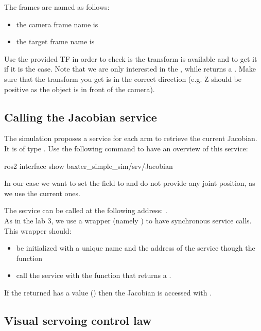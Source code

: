 \documentclass{ecnreport}
\begin{document}
The frames are named as follows:
 \begin{itemize}
  \item the camera frame name is 
  \item the target frame name is 
  \end{itemize}

  Use the provided TF  in order to check is the transform is available and to get it if it is the case.
  Note that we are only interested in the , while  returns a . Make sure that the transform you get is in the correct direction (e.g. Z should be positive as the object is in front of the camera).

\subsection{Calling the Jacobian service}

The simulation proposes a service for each arm to retrieve the current Jacobian. It is of type . Use the following command to have an overview of this service:
\begin{bashcodelarge}
ros2 interface show baxter_simple_sim/srv/Jacobian
\end{bashcodelarge}

In our case we want to set the  field to  and do not provide any joint position, as we use the current ones.

The service can be called at the following address: .\\
As in the lab 3, we use a wrapper (namely ) to have synchronous service calls. This wrapper should:
\begin{itemize}
 \item be initialized with a unique name and the address of the service though the  function
 \item call the service with the  function that returns a .
\end{itemize}
If the returned  has a value () then the Jacobian is accessed with .

\subsection{Visual servoing control law}
\end{document}
